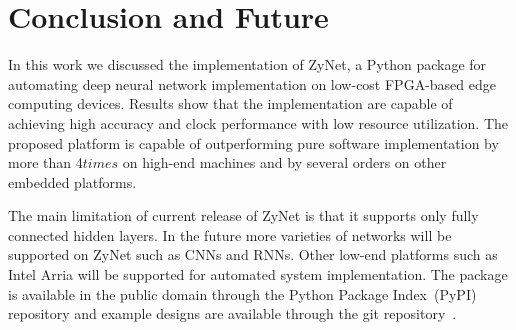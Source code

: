 \section{Conclusion and Future}
\label{sec_conclusion}
In this work we discussed the implementation of ZyNet, a Python package for automating deep neural network implementation on low-cost FPGA-based edge computing devices.
Results show that the implementation are capable of achieving high accuracy and clock performance with low resource utilization.
The proposed platform is capable of outperforming pure software implementation by more than 4$times$ on high-end machines and by several orders on other embedded platforms.

The main limitation of current release of ZyNet is that it supports only fully connected hidden layers.
In the future more varieties of networks will be supported on ZyNet such as CNNs and RNNs.
Other low-end platforms such as Intel Arria will be supported for automated system implementation.
The package is available in the public domain through the Python Package Index~(PyPI) repository and example designs are available through the git repository~\cite{zynetgit}. 